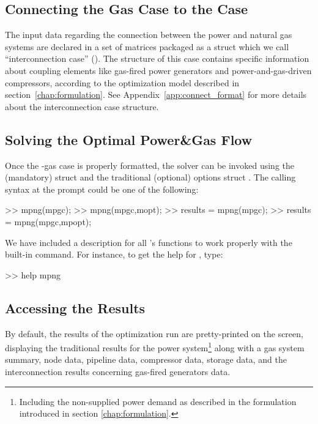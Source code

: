\subsection{Connecting the Gas Case to the \matpower{} Case}
\label{subsec:connect_case}

The input data regarding the connection between the power and natural gas systems are declared in a set of matrices packaged as a \matlab{} struct which we call ``interconnection case'' (). The structure of this case contains specific information about coupling elements like gas-fired power generators and power-and-gas-driven compressors, according to the optimization model described in section~\ref{chap:formulation}. See Appendix~\ref{app:connect_format} for more details about the interconnection case structure.

\subsection{Solving the Optimal Power\&Gas Flow}
\label{subsec:solve_OPGF}

Once the \matpower{}-gas case is properly formatted, the solver can be invoked using the (mandatory)  struct and the traditional (optional) \matpower{} options struct . The calling syntax at the \matlab{} prompt could be one of the following:  

\begin{Code}
>> mpng(mpgc);
>> mpng(mpgc,mopt);
>> results = mpng(mpgc);	
>> results = mpng(mpgc,mpopt);
\end{Code}

We have included a description for all \mpng{}'s functions to work properly with the built-in  command. For instance, to get the help for , type:

\begin{Code}
>> help mpng
\end{Code}

\subsection{Accessing the Results}
\label{subsec:view_results}

By default, the results of the optimization run are pretty-printed on the screen, displaying the traditional \matpower{} results for the power system\footnote{Including the non-supplied power demand as described in the formulation introduced in section \ref{chap:formulation}.} along with a gas system summary, node data, pipeline data, compressor data, storage data, and the interconnection results concerning gas-fired generators data.   

